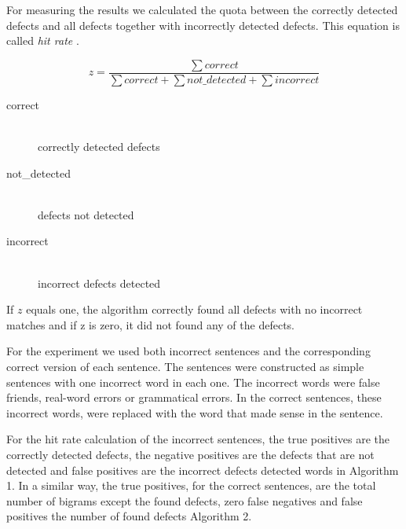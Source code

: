 \documentclass[a4paper,12pt]{article}
\begin{document}
For measuring the results we calculated the quota between the correctly detected defects and all defects together with incorrectly detected defects. This equation is called \emph{hit rate} \cite{ghayoomi2005word}.

$$z = \frac{\sum correct}{\sum correct + \sum not\_detected + \sum incorrect}$$
\begin{description}
  \item[correct] \hfill \\
  		correctly detected defects
  \item[not\_detected] \hfill \\
  		defects not detected
  \item[incorrect] \hfill \\
   		incorrect defects detected
\end{description}

If $z$ equals one, the algorithm correctly found all defects with no incorrect matches and if z is zero, it did not found any of the defects.

For the experiment we used both incorrect sentences and the corresponding correct version of each sentence. The sentences were constructed as simple sentences with one incorrect word in each one. The incorrect words were false friends, real-word errors or grammatical errors. In the correct sentences, these incorrect words, were replaced with the word that made sense in the sentence. 

For the hit rate calculation of the incorrect sentences, the true positives are the correctly detected defects, the negative positives are the defects that are not detected and false positives are the incorrect defects detected words in Algorithm 1. In a similar way, the true positives, for the correct sentences, are the total number of bigrams except the found defects, zero false negatives and false positives the number of found defects Algorithm 2.
 
\end{document}
